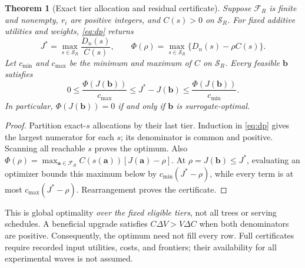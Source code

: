 \documentclass{article}
\newtheorem{theorem}{Theorem}
\begin{document}
\begin{theorem}[Exact tier allocation and residual certificate]
\label{thm:dp}
Suppose $\mathcal F_R$ is finite and nonempty, $r_i$ are positive integers, and $C(s)>0$ on $\mathcal S_R$. For fixed additive utilities and weights, \cref{eq:dp} returns
\begin{equation}
J^*=\max_{s\in\mathcal S_R}\frac{D_n(s)}{C(s)},\qquad
\Phi(\rho)=\max_{s\in\mathcal S_R}\{D_n(s)-\rho C(s)\}.
\label{eq:main-optimum}
\end{equation}
Let $c_{\min}$ and $c_{\max}$ be the minimum and maximum of $C$ on $\mathcal S_R$. Every feasible $\boldsymbol b$ satisfies
\begin{equation}
0\le\frac{\Phi(J(\boldsymbol b))}{c_{\max}}
\le J^*-J(\boldsymbol b)
\le\frac{\Phi(J(\boldsymbol b))}{c_{\min}}.
\label{eq:main-certificate}
\end{equation}
In particular, $\Phi(J(\boldsymbol b))=0$ if and only if $\boldsymbol b$ is surrogate-optimal.
\end{theorem}
\begin{proof}
Partition exact-$s$ allocations by their last tier. Induction in \cref{eq:dp} gives the largest numerator for each $s$; its denominator is common and positive. Scanning all reachable $s$ proves the optimum. Also $\Phi(\rho)=\max_{\boldsymbol a\in\mathcal F_R}C(s(\boldsymbol a))[J(\boldsymbol a)-\rho]$. At $\rho=J(\boldsymbol b)\le J^*$, evaluating an optimizer bounds this maximum below by $c_{\min}(J^*-\rho)$, while every term is at most $c_{\max}(J^*-\rho)$. Rearrangement proves the certificate.
\end{proof}

This is global optimality \emph{over the fixed eligible tiers}, not all trees or serving schedules. A beneficial upgrade satisfies $C\Delta V>V\Delta C$ when both denominators are positive. Consequently, the optimum need not fill every row. Full certificates require recorded input utilities, costs, and frontiers; their availability for all experimental waves is not assumed.
\end{document}
